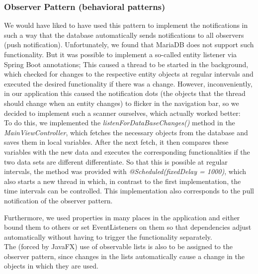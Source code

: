 \subsubsection{Observer Pattern (behavioral patterns)}
\label{subsec:observer-pattern}
We would have liked to have used this pattern to implement the notifications in such a way that the database automatically sends notifications to all observers (push notification). Unfortunately, we found that MariaDB does not support such functionality. But it was possible to implement a so-called entity listener via Spring Boot annotations; This caused a thread to be started in the background, which checked for changes to the respective entity objects at regular intervals and executed the desired functionality if there was a change. However, inconveniently, in our application this caused the notification dots (the objects that the thread should change when an entity changes) to flicker in the navigation bar, so we decided to implement such a scanner ourselves, which actually worked better: \\
To do this, we implemented the \textit{listenForDataBaseChanges()} method in the \textit{MainViewController}, which fetches the necessary objects from the database and saves them in local variables. After the next fetch, it then compares these variables with the new data and executes the corresponding functionalities if the two data sets are different differentiate. So that this is possible at regular intervals, the method was provided with \textit{@Scheduled(fixedDelay = 1000)}, which also starts a new thread in which, in contrast to the first implementation, the time intervals can be controlled. This implementation also corresponds to the pull notification of the observer pattern.

Furthermore, we used properties in many places in the application and either bound them to others or set EventListeners on them so that dependencies adjust automatically without having to trigger the functionality separately. \\
The (forced by JavaFX) use of observable lists is also to be assigned to the observer pattern, since changes in the lists automatically cause a change in the objects in which they are used.


